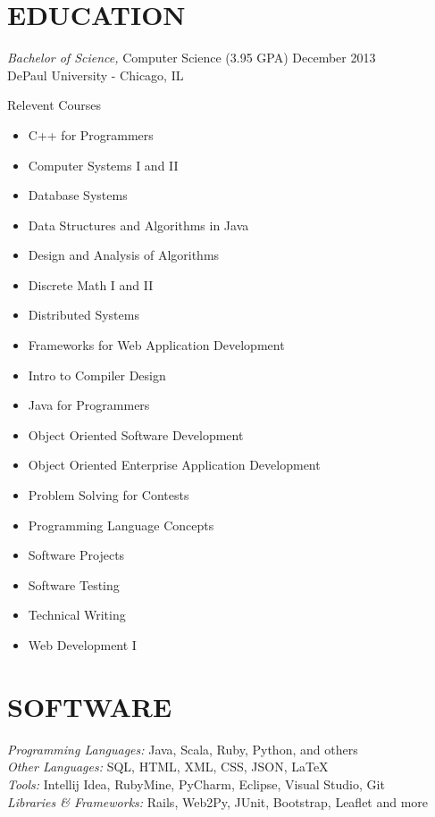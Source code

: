 \documentclass[margin]{res}
\begin{document}
\begin{resume}
\section{EDUCATION} 
                {\sl Bachelor of Science,} Computer Science (3.95 GPA) \hfill December 2013 \\
                DePaul University - Chicago, IL 
                \begin{multicols}{2} \centerline{Relevent Courses}
                  \begin{itemize} \itemsep -2pt 
                    \item C++ for Programmers
                    \item Computer Systems I and II
                    \item Database Systems
                    \item Data Structures and Algorithms in Java
                    \item Design and Analysis of Algorithms
                    \item Discrete Math I and II
                    \item Distributed Systems
                    \item Frameworks for Web Application Development
                    \item Intro to Compiler Design
                    \item Java for Programmers
                    \item Object Oriented Software Development
                    \item Object Oriented Enterprise Application Development
                    \item Problem Solving for Contests
                    \item Programming Language Concepts
                    \item Software Projects
                    \item Software Testing
                    \item Technical Writing
                    \item Web Development I
                  \end{itemize}
                \end{multicols}

\section{SOFTWARE} 
                {\sl Programming Languages:} Java, Scala, Ruby, Python, and others \\
                {\sl Other Languages:} SQL, HTML, XML, CSS, JSON, \LaTeX \\ 
                {\sl Tools:} Intellij Idea, RubyMine, PyCharm, Eclipse, Visual Studio, Git \\
                {\sl Libraries \& Frameworks:} Rails, Web2Py, JUnit, Bootstrap, Leaflet and more 
 

\end{resume}
\end{document}
